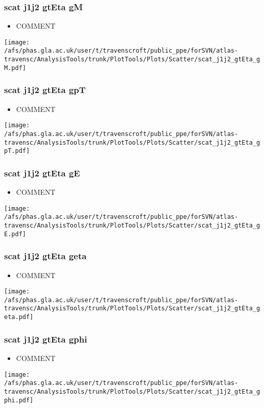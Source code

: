 \documentclass{beamer}
\begin{document}
\begin{frame}
\frametitle{scat j1j2 gtEta gM}
\begin{itemize}
\item COMMENT
\end{itemize}
\begin{center}
\texttt{[image: /afs/phas.gla.ac.uk/user/t/travenscroft/public\_ppe/forSVN/atlas-travensc/AnalysisTools/trunk/PlotTools/Plots/Scatter/scat\_j1j2\_gtEta\_gM.pdf]}
\end{center}
\end{frame}

\begin{frame}
\frametitle{scat j1j2 gtEta gpT}
\begin{itemize}
\item COMMENT
\end{itemize}
\begin{center}
\texttt{[image: /afs/phas.gla.ac.uk/user/t/travenscroft/public\_ppe/forSVN/atlas-travensc/AnalysisTools/trunk/PlotTools/Plots/Scatter/scat\_j1j2\_gtEta\_gpT.pdf]}
\end{center}
\end{frame}

\begin{frame}
\frametitle{scat j1j2 gtEta gE}
\begin{itemize}
\item COMMENT
\end{itemize}
\begin{center}
\texttt{[image: /afs/phas.gla.ac.uk/user/t/travenscroft/public\_ppe/forSVN/atlas-travensc/AnalysisTools/trunk/PlotTools/Plots/Scatter/scat\_j1j2\_gtEta\_gE.pdf]}
\end{center}
\end{frame}

\begin{frame}
\frametitle{scat j1j2 gtEta geta}
\begin{itemize}
\item COMMENT
\end{itemize}
\begin{center}
\texttt{[image: /afs/phas.gla.ac.uk/user/t/travenscroft/public\_ppe/forSVN/atlas-travensc/AnalysisTools/trunk/PlotTools/Plots/Scatter/scat\_j1j2\_gtEta\_geta.pdf]}
\end{center}
\end{frame}

\begin{frame}
\frametitle{scat j1j2 gtEta gphi}
\begin{itemize}
\item COMMENT
\end{itemize}
\begin{center}
\texttt{[image: /afs/phas.gla.ac.uk/user/t/travenscroft/public\_ppe/forSVN/atlas-travensc/AnalysisTools/trunk/PlotTools/Plots/Scatter/scat\_j1j2\_gtEta\_gphi.pdf]}
\end{center}
\end{frame}
\end{document}
